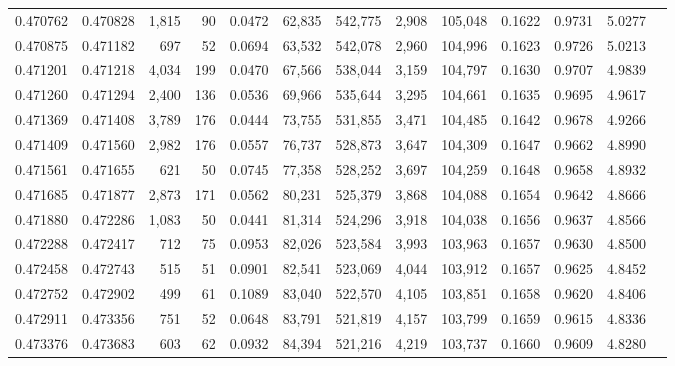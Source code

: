 \begin{tabular}{rrrrrrrrrrrrr}
0.470762 & 0.470828 & 1,815 &    90 &                                     0.0472 &  62,835 & 542,775 &   2,908 & 105,048 & 0.1622 & 0.9731 & 5.0277 \\
0.470875 & 0.471182 &   697 &    52 &                                     0.0694 &  63,532 & 542,078 &   2,960 & 104,996 & 0.1623 & 0.9726 & 5.0213 \\
0.471201 & 0.471218 & 4,034 &   199 &                                     0.0470 &  67,566 & 538,044 &   3,159 & 104,797 & 0.1630 & 0.9707 & 4.9839 \\
0.471260 & 0.471294 & 2,400 &   136 &                                     0.0536 &  69,966 & 535,644 &   3,295 & 104,661 & 0.1635 & 0.9695 & 4.9617 \\
0.471369 & 0.471408 & 3,789 &   176 &                                     0.0444 &  73,755 & 531,855 &   3,471 & 104,485 & 0.1642 & 0.9678 & 4.9266 \\
0.471409 & 0.471560 & 2,982 &   176 &                                     0.0557 &  76,737 & 528,873 &   3,647 & 104,309 & 0.1647 & 0.9662 & 4.8990 \\
0.471561 & 0.471655 &   621 &    50 &                                     0.0745 &  77,358 & 528,252 &   3,697 & 104,259 & 0.1648 & 0.9658 & 4.8932 \\
0.471685 & 0.471877 & 2,873 &   171 &                                     0.0562 &  80,231 & 525,379 &   3,868 & 104,088 & 0.1654 & 0.9642 & 4.8666 \\
0.471880 & 0.472286 & 1,083 &    50 &                                     0.0441 &  81,314 & 524,296 &   3,918 & 104,038 & 0.1656 & 0.9637 & 4.8566 \\
0.472288 & 0.472417 &   712 &    75 &                                     0.0953 &  82,026 & 523,584 &   3,993 & 103,963 & 0.1657 & 0.9630 & 4.8500 \\
0.472458 & 0.472743 &   515 &    51 &                                     0.0901 &  82,541 & 523,069 &   4,044 & 103,912 & 0.1657 & 0.9625 & 4.8452 \\
0.472752 & 0.472902 &   499 &    61 &                                     0.1089 &  83,040 & 522,570 &   4,105 & 103,851 & 0.1658 & 0.9620 & 4.8406 \\
0.472911 & 0.473356 &   751 &    52 &                                     0.0648 &  83,791 & 521,819 &   4,157 & 103,799 & 0.1659 & 0.9615 & 4.8336 \\
0.473376 & 0.473683 &   603 &    62 &                                     0.0932 &  84,394 & 521,216 &   4,219 & 103,737 & 0.1660 & 0.9609 & 4.8280 \\

\end{tabular}
